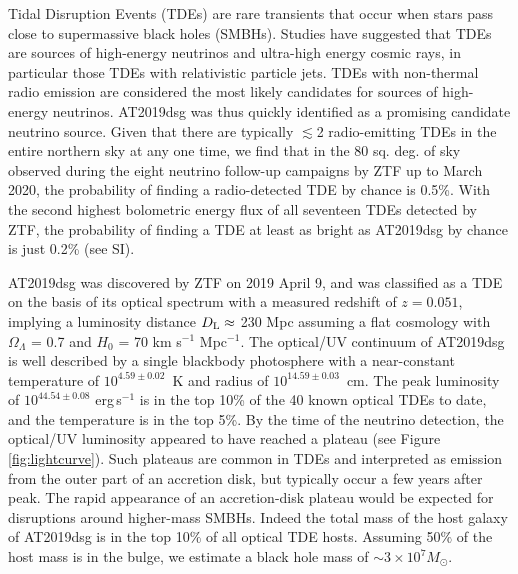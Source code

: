 \documentclass{nature_plusfigure}
\newcommand{\Msol}{\mbox{$M_{\odot}$}}
\begin{document}
Tidal Disruption Events (TDEs) are rare transients that occur when stars pass close to supermassive black holes (SMBHs). Studies have suggested that TDEs are sources of high-energy neutrinos and ultra-high energy cosmic rays\cite{2009ApJ...693..329F,2017MNRAS.469.1354D}, in particular those TDEs with relativistic particle jets\cite{2014arXiv1411.0704F,2017ApJ...838....3S,2016PhRvD..93h3005W,2017PhRvD..95l3001L}. TDEs with non-thermal radio emission are considered the most likely candidates for sources of high-energy neutrinos. AT2019dsg was thus quickly identified as a promising candidate neutrino source\cite{2019ATel13160....1S}. Given that there are typically $\lesssim$2 radio-emitting TDEs in the entire northern sky at any one time, we find that in the 80 sq. deg. of sky observed during the eight neutrino follow-up campaigns by ZTF up to March 2020, the probability of finding a radio-detected TDE by chance is 0.5\%. With the second highest bolometric energy flux of all seventeen TDEs detected by ZTF, the probability of finding a TDE at least as bright as AT2019dsg by chance is just 0.2\% (see SI).

AT2019dsg was discovered\cite{2019TNSTR.615....1N} by ZTF on 2019 April 9, and was classified as a TDE on the basis of its optical spectrum\cite{2019ATel12752....1N} with a measured redshift of $z=0.051$, implying a luminosity distance $D_{\rm L} \approx$ 230 Mpc assuming a flat cosmology with $\Omega_{\Lambda}$ = 0.7 and $H_{0}$ = 70 km s$^{-1}$ Mpc$^{-1}$. The optical/UV continuum of AT2019dsg is well described by a single blackbody photosphere with a near-constant temperature\cite{2020arXiv200101409V} of $10^{4.59 \pm 0.02}$~K and radius of $10^{14.59 \pm 0.03}$~cm. The peak luminosity of $10^{44.54 \pm 0.08}$ erg\,s$^{-1}$ is in the top 10\% of the 40 known optical TDEs to date\cite{2020arXiv200101409V}, and the temperature is in the top 5\%. By the time of the neutrino detection, the optical/UV luminosity appeared to have reached a plateau (see Figure \ref{fig:lightcurve}). Such plateaus are common in TDEs and interpreted as emission from the outer part of an accretion disk\cite{2019ApJ...878...82V,2020MNRAS.492.5655M}, but typically occur a few years after peak. The rapid appearance of an accretion-disk plateau would be expected for disruptions around higher-mass SMBHs. Indeed the total mass of the host galaxy of AT2019dsg is in the top 10$\%$ of all optical TDE hosts. Assuming 50$\%$ of the host mass is in the bulge, we estimate\cite{2013ApJ...764..184M} a black
hole mass of $\sim 3 \times 10^{7} \Msol$.
\end{document}
